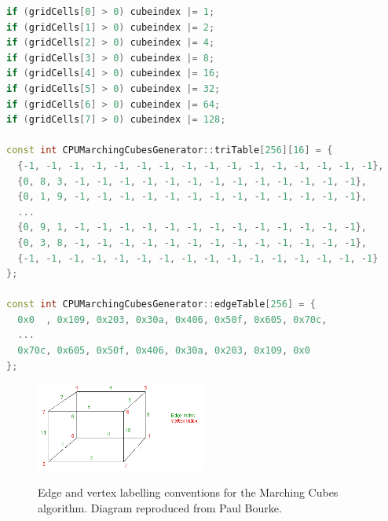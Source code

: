 \documentclass{article}
\begin{document}
\begin{lstlisting}[language=C++,label={mc_tables},caption={Lookup table indexing method, and excerpts from the 2 lookup tables used in the Marching Cubes algorithm. The variable \texttt{cubeindex} is the index into \texttt{triTable} and \texttt{edgeTable}, where each of the first 8 bits of the variable corresponds to a vertex, as per the labelling convention in figure \ref{fig:marching_cubes_labels}. An entry in \texttt{edgeTable} is a record of which edges will have vertices on them, with the first 12 bits corresponding to the 12 edges, as per the labelling convention, and an entry in \texttt{triTable} is an ordered list of how these vertices are joined together. For example, if only cell vertex 0 is outside of the surface (\texttt{gridCells[0] > 0}), the binary value of \texttt{cubeindex} will be $00000001$. The corresponding entry in \texttt{edgeTable} is \texttt{0x109}, binary value $100001001$. Bits 0, 3, and 8 are chosen, corresponding to edges 0, 3, and 8. Finally, the corresponding entry in \texttt{triTable} corresponds to a triangle being generated using vertices on edges 0, 8, and 3, in that order. Conversely, if all cell vertices except vertex 0 are outside of the surface, then \texttt{cubeindex} is $11111110$, the corresponding entry in \texttt{edgeTable} is \texttt{0x109}, however the corresponding entry in \texttt{triTable} represents a triangle using the vertices in the order 0, 3, 8.}]
if (gridCells[0] > 0) cubeindex |= 1;
if (gridCells[1] > 0) cubeindex |= 2;
if (gridCells[2] > 0) cubeindex |= 4;
if (gridCells[3] > 0) cubeindex |= 8;
if (gridCells[4] > 0) cubeindex |= 16;
if (gridCells[5] > 0) cubeindex |= 32;
if (gridCells[6] > 0) cubeindex |= 64;
if (gridCells[7] > 0) cubeindex |= 128;

const int CPUMarchingCubesGenerator::triTable[256][16] = {
  {-1, -1, -1, -1, -1, -1, -1, -1, -1, -1, -1, -1, -1, -1, -1, -1},
  {0, 8, 3, -1, -1, -1, -1, -1, -1, -1, -1, -1, -1, -1, -1, -1},
  {0, 1, 9, -1, -1, -1, -1, -1, -1, -1, -1, -1, -1, -1, -1, -1},
  ...
  {0, 9, 1, -1, -1, -1, -1, -1, -1, -1, -1, -1, -1, -1, -1, -1},
  {0, 3, 8, -1, -1, -1, -1, -1, -1, -1, -1, -1, -1, -1, -1, -1},
  {-1, -1, -1, -1, -1, -1, -1, -1, -1, -1, -1, -1, -1, -1, -1, -1}
};

const int CPUMarchingCubesGenerator::edgeTable[256] = {
  0x0  , 0x109, 0x203, 0x30a, 0x406, 0x50f, 0x605, 0x70c,
  ...
  0x70c, 0x605, 0x50f, 0x406, 0x30a, 0x203, 0x109, 0x0
};
\end{lstlisting}

\begin{figure}
  \caption{Edge and vertex labelling conventions for the Marching Cubes algorithm. Diagram reproduced from Paul Bourke.\cite{bourke_1994}}
  \includegraphics[width=0.5\textwidth]{marching_cubes_labels}
  \label{fig:marching_cubes_labels}
\end{figure}
\end{document}
